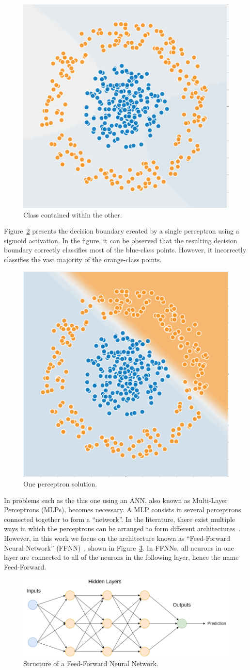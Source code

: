 \begin{figure}[!htbp]
    \centering
    \includegraphics[width=.35\textwidth]{Images/circles.png}
    \caption{Class contained within the other.}
    \label{fig:unsolvable}
\end{figure}

Figure~\ref{fig:one_perceptron} presents the decision boundary created by a
single perceptron using a sigmoid activation. In the figure, it can be observed
that the resulting decision boundary correctly classifies most of the blue-class
points. However, it incorrectly classifies the vast majority of the orange-class
points.

\begin{figure}[!htbp]
    \centering
    \includegraphics[width=.35\textwidth]{Images/circles_perceptron.png}
    \caption{One perceptron solution.}
    \label{fig:one_perceptron}
\end{figure}

In problems such as the this one using an ANN, also known as Multi-Layer
Perceptrons (MLPs), becomes necessary. A MLP consists in several perceptrons
connected together to form a ``network''. In the literature, there exist
multiple ways in which the perceptrons can be arranged to form different
architectures~\cite{deep_learning_overview}. However, in this work we focus on
the architecture known as ``Feed-Forward Neural Network'' (FFNN)~\cite{ffnn},
shown in Figure~\ref{fig:ffnn}. In FFNNs, all neurons in one layer are connected
to all of the neurons in the following layer, hence the name Feed-Forward.

\begin{figure}[!htbp]
    \centering
    \includegraphics[width=.5\textwidth]{Images/mlp.png}
    \caption{Structure of a Feed-Forward Neural Network.}
    \label{fig:ffnn}
\end{figure}

